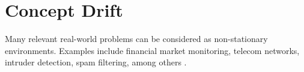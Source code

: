 \documentclass[preprint,12pt]{elsarticle}
\begin{document}




\section{Concept Drift}
\label{sec:concept_drift}



%
Many relevant real-world problems can be considered as non-stationary environments.
Examples include financial market monitoring, telecom networks, intruder detection, spam filtering, among others \cite{Gama:2014:DAF:2670967.2670971}.
\end{document}
